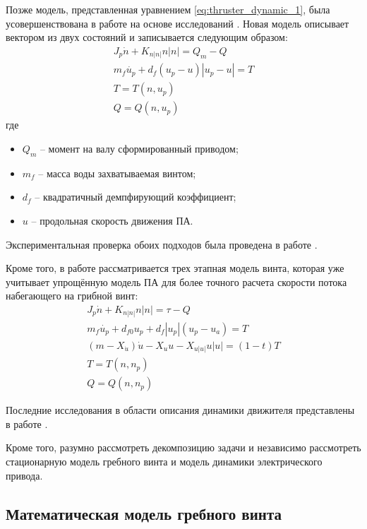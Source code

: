 Позже модель, представленная уравнением \ref{eq:thruster_dynamic_1}, была усовершенствована в работе \cite{10.1109/48.468242} на основе исследований \cite{cody1992experimental, mclean1991dynamic}.
Новая модель описывает вектором из двух состояний и записывается следующим образом:
\begin{gather*}
    J_p\dot{n} + K_{n|n|}n|n| = Q_m- Q \\
    m_f \dot{u_p} + d_f(u_p-u) |u_p - u| = T \\
    T = T(n,u_p) \\
    Q = Q(n,u_p)
\end{gather*}
\noindent где
\begin{itemize}
    \item $Q_m$ -- момент на валу сформированный приводом;
    \item $m_f$ -- масса воды захватываемая винтом;
    \item $d_f$ -- квадратичный демпфирующий коэффициент;
    \item $u$ -- продольная скорость движения ПА.
\end{itemize}

Экспериментальная проверка обоих подходов была проведена в работе \cite{whitcomb1999development}.

Кроме того, в работе \cite{blanke2000dynamic} рассматривается трех этапная модель винта, которая уже учитывает упрощённую модель ПА для более точного расчета скорости потока набегающего на грибной винт:
\begin{gather*}
    J_p\dot{n} + K_{n|n|}n|n| = \tau - Q \\
    m_f \dot{u_p} + d_{f0}u_p + d_f|u_p|(u_p - u_a) = T \\
    (m - X_{\dot{u}})\dot{u} - X_u u - X_{u|u|}u|u| = (1-t)T\\
    T = T(n,n_p) \\
    Q = Q(n,n_p)
\end{gather*}

Последние исследования в области описания динамики движителя представлены в работе \cite{10.1109/robot.2005.1570115}.

Кроме того, разумно рассмотреть декомпозицию задачи и независимо рассмотреть стационарную модель гребного винта и модель динамики электрического привода.

\subsection{Математическая модель гребного винта}

